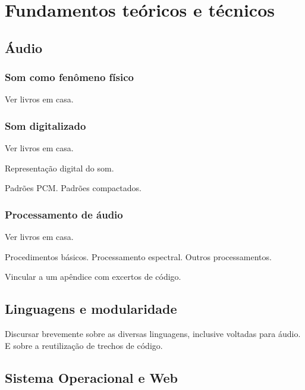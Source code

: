 \chapter{Fundamentos teóricos e técnicos} %
\label{cap:intro} %

\section{Áudio}

\subsection{Som como fenômeno físico}

Ver livros em casa.

\subsection{Som digitalizado}

Ver livros em casa.

Representação digital do som.

Padrões PCM. Padrões compactados.

\subsection{Processamento de áudio}

Ver livros em casa.

Procedimentos básicos. Processamento
espectral. Outros processamentos.

Vincular a um apêndice com excertos de código.

\section{Linguagens e modularidade}

Discursar brevemente sobre as diversas linguagens,
inclusive voltadas para áudio. E sobre a reutilização
de trechos de código.

\section{Sistema Operacional e Web}

